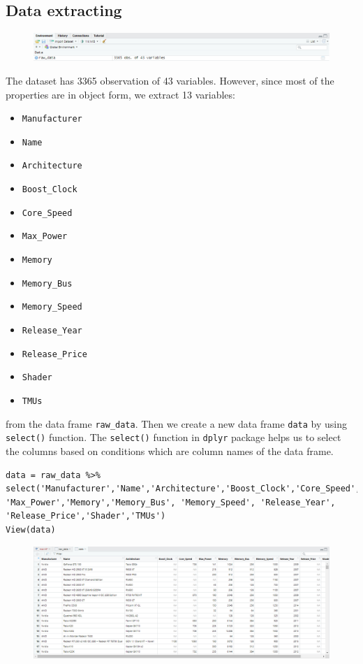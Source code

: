 \documentclass[a4paper]{article}
\begin{document}
\subsection{Data extracting}
\begin{figure}[H]
    \centering
    \includegraphics[keepaspectratio, width=1\textwidth, height=1\textheight]{Clean/1.png}
\end{figure}
The dataset has 3365 observation of 43 variables. However, since most of the properties are in object form, we extract 13 variables:
\begin{itemize}
    \item \verb|Manufacturer| 
    \item \verb|Name| 
    \item \verb|Architecture|
    \item \verb|Boost_Clock|
    \item \verb|Core_Speed|
    \item \verb|Max_Power|
    \item \verb|Memory|
    \item \verb|Memory_Bus|
    \item \verb|Memory_Speed|
    \item \verb|Release_Year|
    \item \verb|Release_Price|
    \item \verb|Shader|
    \item \verb|TMUs|
\end{itemize}
from the data frame \verb|raw_data|. Then we create a new data frame \verb|data| by using \verb|select()| function. The \verb|select()| function in \verb|dplyr| package helps us to select the columns based on conditions which are column names of the data frame.
\begin{mdframed}[leftline=false,rightline=false,backgroundcolor=lightblue!10,nobreak=false]
    \begin{verbatim}
data = raw_data %>% select('Manufacturer','Name','Architecture','Boost_Clock','Core_Speed',
'Max_Power','Memory','Memory_Bus', 'Memory_Speed', 'Release_Year', 'Release_Price','Shader','TMUs')
View(data)
    \end{verbatim}
\end{mdframed}
\begin{figure}[H]
    \centering
    \includegraphics[keepaspectratio, width=1\textwidth, height=1\textheight]{Clean/2.png}
\end{figure}
\end{document}
